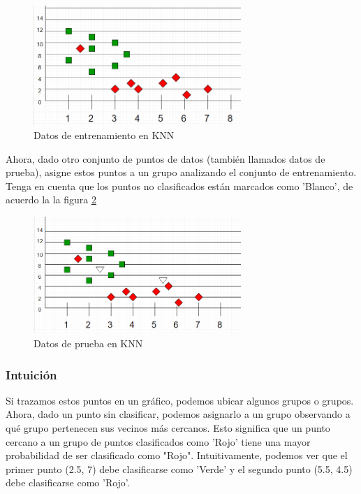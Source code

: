 \documentclass{article}
\begin{document}
\begin{figure}[h!]
	\centering
	\includegraphics[width=0.7\textwidth]{img/knn_01.png}
	\caption{Datos de entrenamiento en KNN}
	\label{fig:knn_01}
\end{figure}

Ahora, dado otro conjunto de puntos de datos (también llamados datos de prueba), asigne estos puntos a un grupo analizando el conjunto de entrenamiento. Tenga en cuenta que los puntos no clasificados están marcados como 'Blanco', de acuerdo la la figura \ref{fig:knn_02}

\begin{figure}[h!]
	\centering
	\includegraphics[width=0.7\textwidth]{img/knn_02.png}
	\caption{Datos de prueba en KNN}
	\label{fig:knn_02}
\end{figure}

\subsubsection{Intuición}
Si trazamos estos puntos en un gráfico, podemos ubicar algunos grupos o grupos. Ahora, dado un punto sin clasificar, podemos asignarlo a un grupo observando a qué grupo pertenecen sus vecinos más cercanos. Esto significa que un punto cercano a un grupo de puntos clasificados como 'Rojo' tiene una mayor probabilidad de ser clasificado como "Rojo".
Intuitivamente, podemos ver que el primer punto (2.5, 7) debe clasificarse como 'Verde' y el segundo punto (5.5, 4.5) debe clasificarse como 'Rojo'.
\end{document}
